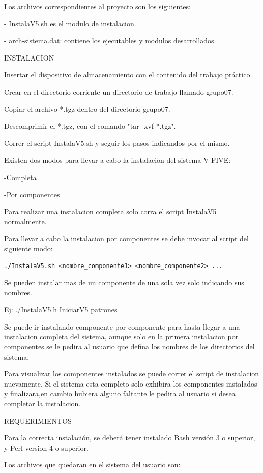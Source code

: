 \documentclass[a4paper,10pt,titlepage]{article}
\begin{document}
Los archivos correspondientes al proyecto son los siguientes:

- InstalaV5.sh es el modulo de instalacion.

- arch-sistema.dat: contiene los ejecutables y modulos desarrollados.

INSTALACION

Insertar el dispositivo de almacenamiento con el contenido del trabajo práctico.

Crear en el directorio corriente un directorio de trabajo llamado grupo07.

Copiar el archivo *.tgz dentro del directorio grupo07.

Descomprimir el *.tgz, con el comando "tar -xvf *.tgz".

Correr el script InstalaV5.sh y seguir los pasos indicandos por el mismo.

Existen dos modos para llevar a cabo la instalacion del sistema V-FIVE:

-Completa

-Por componentes 

Para realizar una instalacion completa solo corra el script InstalaV5 normalmente.

Para llevar a cabo la instalacion por componentes se debe invocar al script del siguiente modo:

\begin{verbatim}
./InstalaV5.sh <nombre_componente1> <nombre_componente2> ...
\end{verbatim}

Se pueden instalar mas de un componente de una sola vez solo indicando sus nombres.

Ej: ./InstalaV5.h IniciarV5 patrones

Se puede ir instalando componente por componente para hasta llegar a una instalacion completa del sistema, aunque solo en la primera instalacion por componentes se le pedira al usuario que defina los nombres de los directorios del sistema.

Para visualizar los componentes instalados se puede correr el script de instalacion nuevamente. Si el sistema esta completo
solo exhibira los componentes instalados y finalizara,en cambio hubiera alguno faltante le pedira al usuario si desea completar la instalacion.

REQUERIMIENTOS

Para la correcta instalación, se deberá tener instalado Bash versión 3 o superior, y Perl version 4 o superior.

Los archivos que quedaran en el sistema del usuario son:
\end{document}
